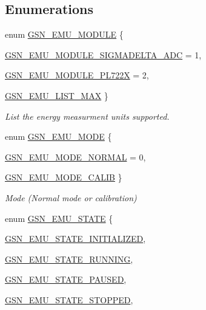 \subsection*{Enumerations}
\begin{DoxyCompactItemize}
\item 
enum \hyperlink{a00663_ga2347334b7caf4141497a9455bf724391}{GSN\_\-EMU\_\-MODULE} \{ \par
\hyperlink{a00663_gga2347334b7caf4141497a9455bf724391ac84d7d94bd84bd9343797ccfe1c73e2b}{GSN\_\-EMU\_\-MODULE\_\-SIGMADELTA\_\-ADC} =  1, 
\par
\hyperlink{a00663_gga2347334b7caf4141497a9455bf724391ae2242b3501ae5696e698110a07406847}{GSN\_\-EMU\_\-MODULE\_\-PL722X} =  2, 
\par
\hyperlink{a00663_gga2347334b7caf4141497a9455bf724391a00f3f7032ecf58c26c065ad4a761007d}{GSN\_\-EMU\_\-LIST\_\-MAX}
 \}
\begin{DoxyCompactList}\small\item\em List the energy measurment units supported. \end{DoxyCompactList}\item 
enum \hyperlink{a00663_ga0643cb0399fc9877fcce3cccd4672fe2}{GSN\_\-EMU\_\-MODE} \{ \par
\hyperlink{a00663_gga0643cb0399fc9877fcce3cccd4672fe2aa348f73bf0620e4a4cebee4a5bec44d6}{GSN\_\-EMU\_\-MODE\_\-NORMAL} =  0, 
\par
\hyperlink{a00663_gga0643cb0399fc9877fcce3cccd4672fe2a2fc2b64cf2e083deed68016cda492870}{GSN\_\-EMU\_\-MODE\_\-CALIB}
 \}
\begin{DoxyCompactList}\small\item\em Mode (Normal mode or calibration) \end{DoxyCompactList}\item 
enum \hyperlink{a00663_gaea130dfd5920349319a192bd421ec2be}{GSN\_\-EMU\_\-STATE} \{ \par
\hyperlink{a00663_ggaea130dfd5920349319a192bd421ec2bea31e04f44859581dbfbbdc3bdf10c0e27}{GSN\_\-EMU\_\-STATE\_\-INITIALIZED}, 
\par
\hyperlink{a00663_ggaea130dfd5920349319a192bd421ec2bea12d34a356e47b5755e574741ccc484c0}{GSN\_\-EMU\_\-STATE\_\-RUNNING}, 
\par
\hyperlink{a00663_ggaea130dfd5920349319a192bd421ec2beafaa1a97351fadea387f0fee5df9f385a}{GSN\_\-EMU\_\-STATE\_\-PAUSED}, 
\par
\hyperlink{a00663_ggaea130dfd5920349319a192bd421ec2bea20017143bae0b73aaaeea8aa57ee6366}{GSN\_\-EMU\_\-STATE\_\-STOPPED}, 

\end{DoxyCompactItemize}
